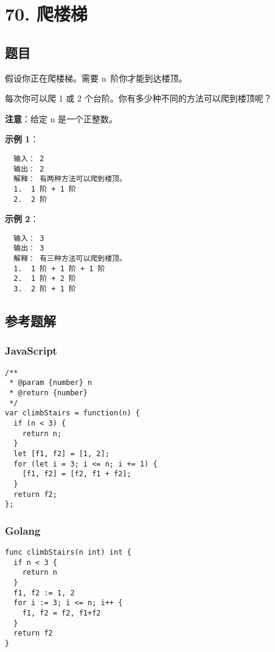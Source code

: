 \newpage
\section{70. 爬楼梯}
\label{leetcode:70}

\subsection{题目}

假设你正在爬楼梯。需要 n 阶你才能到达楼顶。

每次你可以爬 1 或 2 个台阶。你有多少种不同的方法可以爬到楼顶呢？

\textbf{注意}：给定 n 是一个正整数。

\textbf{示例 1}：

\begin{verbatim}
  输入： 2
  输出： 2
  解释： 有两种方法可以爬到楼顶。
  1.  1 阶 + 1 阶
  2.  2 阶
\end{verbatim}

\textbf{示例 2}：

\begin{verbatim}
  输入： 3
  输出： 3
  解释： 有三种方法可以爬到楼顶。
  1.  1 阶 + 1 阶 + 1 阶
  2.  1 阶 + 2 阶
  3.  2 阶 + 1 阶
\end{verbatim}

\subsection{参考题解}

\subsubsection{JavaScript}

\begin{verbatim}
/**
 * @param {number} n
 * @return {number}
 */
var climbStairs = function(n) {
  if (n < 3) {
    return n;
  }
  let [f1, f2] = [1, 2];
  for (let i = 3; i <= n; i += 1) {
    [f1, f2] = [f2, f1 + f2];
  }
  return f2;
};
\end{verbatim}

\subsubsection{Golang}

\begin{verbatim}
func climbStairs(n int) int {
  if n < 3 {
    return n
  }
  f1, f2 := 1, 2
  for i := 3; i <= n; i++ {
    f1, f2 = f2, f1+f2
  }
  return f2
}
\end{verbatim}
